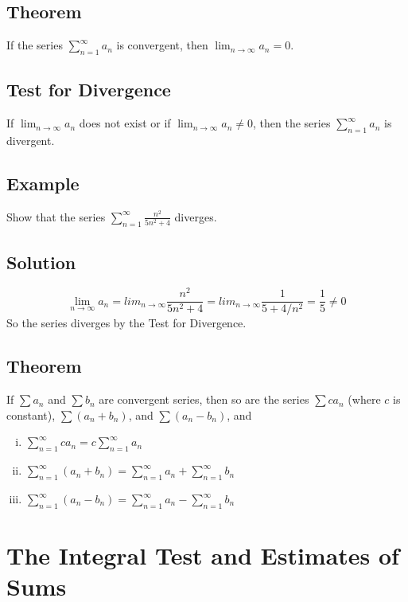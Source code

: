 \subsection*{Theorem}
If the series $\sum_{n=1}^\infty a_n$ is convergent, then
$\lim_{n \to \infty} a_n = 0$.

\subsection*{Test for Divergence}
If $\lim_{n \to \infty} a_n$ does not exist or if $\lim_{n \to \infty} a_n \neq 0$,
then the series $\sum_{n=1}^\infty a_n$ is divergent.

\subsection*{Example}
Show that the series $\sum_{n=1}^\infty \frac{n^2}{5n^2+4}$ diverges.

\subsection*{Solution}
$$\lim_{n\to \infty}a_n=lim_{n\to \infty}\frac{n^2}{5n^2+4}=
    lim_{n\to \infty}\frac{1}{5+4/n^2}=\frac{1}{5}\neq0$$
So the series diverges by the Test for Divergence.

\subsection*{Theorem}
If $\sum a_n$ and $\sum b_n$ are convergent series, then so are the series
$\sum ca_n$ (where $c$ is constant), $\sum (a_n+b_n)$, and $\sum(a_n-b_n)$, and
\begin{enumerate}[(i)]
    \item $\sum_{n=1}^\infty ca_n = c\sum_{n=1}^\infty a_n$
    \item $\sum_{n=1}^\infty(a_n+b_n)=\sum_{n=1}^\infty a_n + \sum_{n=1}^\infty b_n$
    \item $\sum_{n=1}^\infty(a_n-b_n)=\sum_{n=1}^\infty a_n - \sum_{n=1}^\infty b_n$
\end{enumerate}

\section{The Integral Test and Estimates of Sums}

